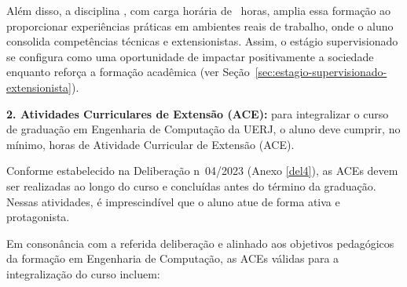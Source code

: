 Além disso, a disciplina \textbf{\EstSup}, com carga horária de \EstSupCH~horas, amplia essa formação ao proporcionar experiências práticas em ambientes reais de trabalho, onde o aluno consolida competências técnicas e extensionistas. Assim, o estágio supervisionado se configura como uma oportunidade de impactar positivamente a sociedade enquanto reforça a formação acadêmica (ver Seção~\ref{sec:estagio-supervisionado-extensionista}).


\textbf{2. Atividades Curriculares de Extensão (ACE):}
para integralizar o curso de graduação em Engenharia de Computação da UERJ, o aluno deve cumprir, no mínimo, \hACE horas de Atividade Curricular de Extensão (ACE).

Conforme estabelecido na Deliberação n\textordmasculine~04/2023 (Anexo \ref{del4}), as ACEs devem ser realizadas ao longo do curso e concluídas antes do término da graduação. Nessas atividades, é imprescindível que o aluno atue de forma ativa e protagonista.

Em consonância com a referida deliberação e alinhado aos objetivos pedagógicos da formação em Engenharia de Computação, as ACEs válidas para a integralização do curso incluem:


